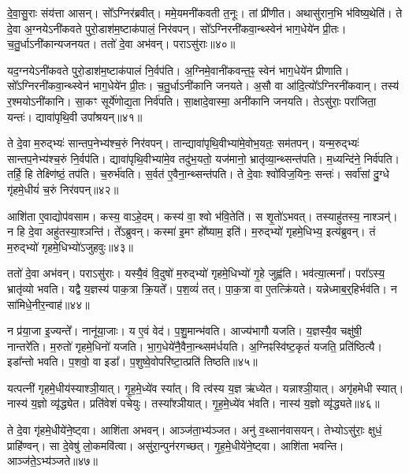 दे॒वा॒सु॒राः संय॑त्ता आसन्।
सो᳚ऽग्निर॑ब्रवीत्।
ममे॒यमनी॑क\-वती त॒नूः।
तां प्री॑णीत।
अथासु॑रान॒भि भ॑विष्य॒थेति॑।
ते दे॒वा अ॒ग्नये\-ऽनी॑कवते पुरो॒डाश॑म॒ष्टा\-क॑पालं॒ निर॑वपन्।
सो᳚ऽग्निरनी॑कवा॒न्थ्स्वेन॑ भाग॒धेये॑न प्री॒तः।
च॒तु॒र्धा\-ऽनी॑कान्य\-जनयत।
ततो॑ दे॒वा अभ॑वन्।
पराऽसु॑राः॥४०॥

यद॒ग्नये\-ऽनी॑कवते पुरो॒डाश॑म॒ष्टा\-क॑पालं नि॒र्वप॑ति।
अ॒ग्निमे॒वा\-नी॑क\-वन्त॒ꣴ॒ स्वेन॑ भाग॒धेये॑न प्रीणाति।
सो᳚ऽग्निरनी॑कवा॒न्थ्स्वेन॑ भाग॒धेये॑न प्री॒तः।
च॒तु॒र्धा\-ऽनी॑कानि जनयते।
अ॒सौ वा आ॑दि॒त्यो᳚\-ऽग्निरनी॑कवान्।
तस्य॑ र॒श्मयो\-ऽनी॑कानि।
सा॒कꣳ सूर्ये॑णोद्य॒ता निर्व॑पति।
सा॒क्षादे॒वास्मा॒ अनी॑कानि जनयति।
तेऽसु॑राः॒ परा॑जिता॒ यन्तः॑।
द्यावा॑पृथि॒वी उपा᳚श्रयन्॥४१॥

ते दे॒वा म॒रुद्भ्यः॑ सान्तप॒नेभ्य॑श्च॒रुं निर॑वपन्।
तान्द्यावा॑पृथि॒वी\-भ्या॑मे॒वोभ॒यतः॒ सम॑तपन्।
यन्म॒रुद्भ्यः॑ सान्तप॒नेभ्य॑श्च॒रुं नि॒र्वप॑ति।
द्यावा॑पृथि॒वीभ्या॑मे॒व तदु॑भ॒यतो॒ यज॑मानो॒ भ्रातृ॑व्या॒न्थ्सन्त॑पति।
म॒ध्यन्दि॑ने॒ निर्व॑पति।
तर्\mbox{}हि॒ हि तेक्ष्णि॑ष्ठं॒ तप॑ति।
च॒रुर्भ॑वति।
स॒र्वत॑ ए॒वैना॒न्थ्सन्त॑पति।
ते दे॒वाः श्वो॑विज॒यिनः॒ सन्तः॑।
सर्वा॑सां दु॒ग्धे गृ॑हमे॒धीयं॑ च॒रुं निर॑वपन्॥४२॥

आशि॑ता ए॒वाद्योप॑वसाम।
कस्य॒ वाऽहे॒दम्।
कस्य॑ वा॒ श्वो भ॑वि॒तेति॑।
स शृ॒तो॑\-ऽभवत्।
तस्याहु॑तस्य॒ नाश्ञन्॑।
न हि दे॒वा अहु॑तस्या॒श्ञन्ति॑।
ते᳚ऽब्रुवन्।
कस्मा॑ इ॒मꣳ हो᳚ष्याम॒ इति॑।
म॒रुद्भ्यो॑ गृहमे॒धिभ्य॒ इत्य॑ब्रुवन्।
तं म॒रुद्भ्यो॑ गृहमे॒धिभ्यो॑\-ऽजुहवुः॥४३॥

ततो॑ दे॒वा अभ॑वन्।
पराऽसु॑राः।
यस्यै॒वं वि॒दुषो॑ म॒रुद्भ्यो॑ गृहमे॒धिभ्यो॑ गृ॒हे जुह्व॑ति।
भव॑त्या॒त्मना᳚।
परा᳚ऽस्य॒ भ्रातृ॑व्यो भवति।
यद्वै य॒ज्ञस्य॑ पाक॒त्रा क्रि॒यते᳚।
प॒श॒व्यं॑ तत्।
पा॒क॒त्रा वा ए॒तत्क्रि॑यते।
यन्नेध्माब॒र्॒हिर्भव॑ति।
न सा॑मिधे॒नीर॒न्वाह॑॥४४॥

न प्र॑या॒जा इ॒ज्यन्ते᳚।
नानू॑या॒जाः।
य ए॒वं वेद॑।
प॒शु॒मान्भ॑वति।
आज्य॑भागौ यजति।
य॒ज्ञस्यै॒व चक्षु॑षी॒ नान्तरे॑ति।
म॒रुतो॑ गृहमे॒धिनो॑ यजति।
भा॒ग॒धेये॑नै॒वैना॒न्थ्सम॑र्ध\-यति।
अ॒ग्निꣴस्वि॑ष्ट॒कृतं॑ यजति॒ प्रति॑\-ष्ठित्यै।
इडा᳚न्तो भवति।
प॒शवो॒ वा इडा᳚।
प॒शुष्वे॒वोपरि॑ष्टा॒त्प्रति॑ तिष्ठति॥४५॥

यत्पत्नी॑ गृहमे॒धीय॑स्याश्ञी॒यात्।
गृ॒ह॒मे॒ध्ये॑व स्या᳚त्।
वि त्व॑स्य य॒ज्ञ ऋ॑ध्येत।
यन्नाश्ञी॒यात्।
अगृ॑हमेधी स्यात्।
नास्य॑ य॒ज्ञो व्यृ॑द्ध्येत।
प्रति॑\-वेशं पचेयुः।
तस्या᳚श्ञीयात्।
गृ॒ह॒मे॒ध्ये॑व भ॑वति।
नास्य॑ य॒ज्ञो व्यृ॑द्ध्यते॥४६॥

ते दे॒वा गृ॑हमे॒धीये॑ने॒ष्ट्वा।
आशि॑ता अभवन्।
आञ्ज॑ता॒भ्य॑ञ्जत।
अनु॑ व॒थ्सान॑वासयन्।
तेभ्यो\-ऽसु॑राः॒ क्षुधं॒ प्राहि॑ण्वन्।
सा दे॒वेषु॑ लो॒कमवि॑त्वा।
असु॑रा॒न्पुन॑रगच्छत्।
गृ॒ह॒मे॒धीये॑ने॒ष्ट्वा।
आशि॑ता भवन्ति।
आञ्ज॑ते॒\-ऽभ्य॑ञ्जते॥४७॥

